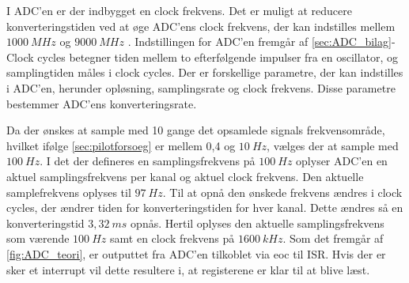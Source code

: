 \noindent
I ADC'en er der indbygget en clock frekvens. Det er muligt at reducere konverteringstiden ved at øge ADC'ens clock frekvens, der kan indstilles mellem $1000~MHz$ og $9000~MHz$ \citep{ADC2014}. Indstillingen for ADC'en fremgår af \autoref{sec:ADC_bilag}- Clock cycles betegner tiden mellem to efterfølgende impulser fra en oscillator, og samplingtiden måles i clock cycles. Der er forskellige parametre, der kan indstilles i ADC'en, herunder opløsning, samplingsrate og clock frekvens. Disse parametre bestemmer ADC'ens konverteringsrate. %

Da der ønskes at sample med 10 gange det opsamlede signals frekvensområde, hvilket ifølge \autoref{sec:pilotforsoeg} er mellem 0,4 og $10~Hz$, vælges der at sample med $100~Hz$. 
I det der defineres en samplingsfrekvens på $100~Hz$ oplyser ADC'en en aktuel samplingsfrekvens per kanal og aktuel clock frekvens. Den aktuelle samplefrekvens oplyses til $97~Hz$. Til at opnå den ønskede frekvens ændres i clock cycles, der ændrer tiden for konverteringstiden for hver kanal. Dette ændres så en konverteringstid $3,32~ms$ opnås. Hertil oplyses den aktuelle samplingsfrekvens som værende $100~Hz$ samt en clock frekvens på $1600~kHz$. 
Som det fremgår af \autoref{fig:ADC_teori}, er outputtet fra ADC'en tilkoblet via eoc til ISR. Hvis der er sker et interrupt vil dette resultere i, at registerene er klar til at blive læst\citep{ADC2014}.


